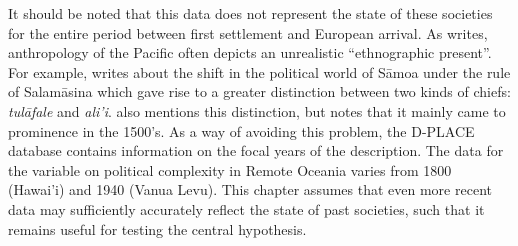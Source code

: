 \documentclass[a4paper,10pt]{article} %
\begin{document}



It should be noted that this data does not represent the state of these societies for the entire period between first settlement and European arrival. As \citet{meleisea1995} writes, anthropology of the Pacific often depicts an unrealistic ``ethnographic present''. For example, \citet[185]{schoeffel87} writes about the shift in the political world of S\={a}moa under the rule of Salam\={a}sina which gave rise to a greater distinction between two kinds of chiefs: \emph{tul\={a}fale} and \emph{ali'i}. \citet[249]{kirch2017road} also mentions this distinction, but notes that it mainly came to prominence in the 1500's. As a way of avoiding this problem, the D-PLACE database \citep{d_place_all} contains information on the focal years of the description. The data for the variable on political complexity in Remote Oceania varies from 1800 (Hawai'i) and 1940 (Vanua Levu). This chapter assumes that even more recent data may sufficiently accurately reflect the state of past societies, such that it remains useful for testing the central hypothesis.
\end{document}
